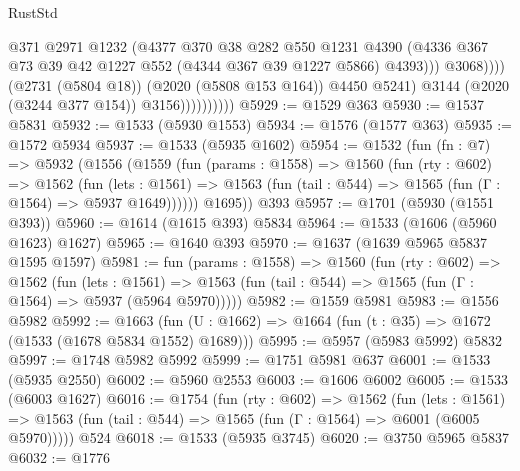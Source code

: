 \begin{lexlean}{RustStd}
\begin{coremodule}
                                    @371
                                    @2971
                                    @1232
                                    (@4377
                                      @370
                                      @38
                                      @282
                                      @550
                                      @1231
                                      @4390
                                      (@4336
                                        @367
                                        @73
                                        @39
                                        @42
                                        @1227
                                        @552
                                        (@4344 @367 @39 @1227 @5866)
                                        @4393)))
                                  @3068))))
                          (@2731 (@5804 @18))
                          (@2020 (@5808 @153 @164))
                          @4450
                          @5241)
                        @3144
                        (@2020 (@3244 @377 @154))
                        @3156))))))))))
@5929 := @1529 @363
@5930 := @1537 @5831
@5932 := @1533 (@5930 @1553)
@5934 := @1576 (@1577 @363)
@5935 := @1572 @5934
@5937 := @1533 (@5935 @1602)
@5954 := @1532
    (fun (fn : @7) =>
    @5932
      (@1556
        (@1559
          (fun (params : @1558) =>
          @1560
            (fun (rty : @602) =>
            @1562
              (fun (lets : @1561) =>
              @1563 (fun (tail : @544) => @1565 (fun (Γ : @1564) => @5937 @1649))))))
        @1695))
    @393
@5957 := @1701 (@5930 (@1551 @393))
@5960 := @1614 (@1615 @393) @5834
@5964 := @1533 (@1606 (@5960 @1623) @1627)
@5965 := @1640 @393
@5970 := @1637 (@1639 @5965 @5837 @1595 @1597)
@5981 := fun (params : @1558) =>
  @1560
    (fun (rty : @602) =>
    @1562
      (fun (lets : @1561) =>
      @1563 (fun (tail : @544) => @1565 (fun (Γ : @1564) => @5937 (@5964 @5970)))))
@5982 := @1559 @5981
@5983 := @1556 @5982
@5992 := @1663 (fun (U : @1662) => @1664 (fun (t : @35) => @1672 (@1533 (@1678 @5834 @1552) @1689)))
@5995 := @5957 (@5983 @5992) @5832
@5997 := @1748 @5982 @5992
@5999 := @1751 @5981 @637
@6001 := @1533 (@5935 @2550)
@6002 := @5960 @2553
@6003 := @1606 @6002
@6005 := @1533 (@6003 @1627)
@6016 := @1754
    (fun (rty : @602) =>
    @1562
      (fun (lets : @1561) =>
      @1563 (fun (tail : @544) => @1565 (fun (Γ : @1564) => @6001 (@6005 @5970)))))
    @524
@6018 := @1533 (@5935 @3745)
@6020 := @3750 @5965 @5837
@6032 := @1776

\end{coremodule}
\end{lexlean}
